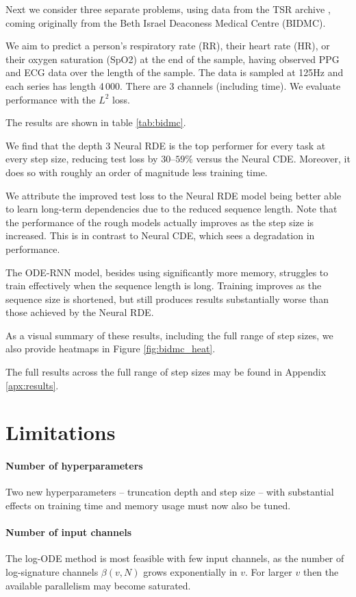 \documentclass{article}
\begin{document}
Next we consider three separate problems, using data from the TSR archive \citep{MonashTSRegressionArchive}, coming originally from the Beth Israel Deaconess Medical Centre (BIDMC).

We aim to predict a person's respiratory rate (RR), their heart rate (HR), or their oxygen saturation (SpO2) at the end of the sample, having observed PPG and ECG data over the length of the sample. The data is sampled at 125Hz and each series has length 4\,000. There are 3 channels (including time). We evaluate performance with the $L^2$ loss.

The results are shown in table \ref{tab:bidmc}.

We find that the depth $3$ Neural RDE is the top performer for every task at every step size, reducing test loss by $30$--$59\%$ versus the Neural CDE. Moreover, it does so with roughly an order of magnitude less training time.

We attribute the improved test loss to the Neural RDE model being better able to learn long-term dependencies due to the reduced sequence length. Note that the performance of the rough models actually improves as the step size is increased. This is in contrast to Neural CDE, which sees a degradation in performance.

The ODE-RNN model, besides using significantly more memory, struggles to train effectively when the sequence length is long. Training improves as the sequence size is shortened, but still produces results substantially worse than those achieved by the Neural RDE.

As a visual summary of these results, including the full range of step sizes, we also provide heatmaps in Figure \ref{fig:bidmc_heat}.

The full results across the full range of step sizes may be found in Appendix \ref{apx:results}. 
\section{Limitations}

\paragraph{Number of hyperparameters} Two new hyperparameters -- truncation depth and step size -- with substantial effects on training time and memory usage must now also be tuned.

\paragraph{Number of input channels} The log-ODE method is most feasible with few input channels, as the number of log-signature channels $\beta(v, N)$ grows exponentially in $v$. For larger $v$ then the available parallelism may become saturated. 
\end{document}
